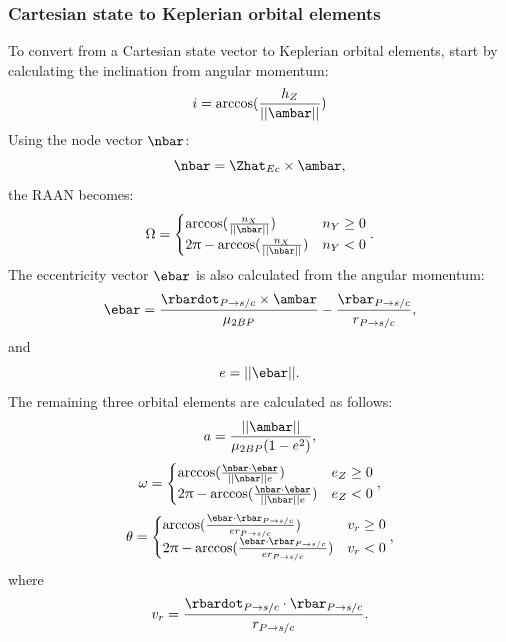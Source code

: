 \subsubsection{Cartesian state to Keplerian orbital elements}
To convert from a Cartesian state vector to Keplerian orbital elements, start by calculating the
inclination from angular momentum:
\begin{equation}
    i=\arccos(\frac{h_{Z}}{||\ambar||})
    \label{eq:inclination}
\end{equation}
Using the node vector $\nbar$:
\begin{equation}
    \nbar=\Zhat_{Ec}\times\ambar,
    \label{eq:nodes}
\end{equation}
the RAAN becomes:
\begin{equation}
    \Omega=\begin{cases}\arccos(\frac{n_{X}}{||\nbar||})&n_{Y}\geq0\cr2\pi-\arccos(\frac{n_{X}}{||\nbar||})&n_{Y}<0\end{cases}.
    \label{RAAN}
\end{equation}
The eccentricity vector $\ebar$ is also calculated from the angular momentum:
\begin{equation}
    \ebar=\frac{\rbardot_{P\rightarrow s/c}\times\ambar}{\mu_{2BP}}-\frac{\rbar_{P\rightarrow s/c}}{r_{P\rightarrow s/c}},
    \label{eq:eccentricityvector}
\end{equation}
and
\begin{equation}
    e=||\ebar||.
    \label{eq:eccentricity}
\end{equation}
The remaining three orbital elements are calculated as follows:
\begin{equation}
    a=\frac{||\ambar||}{\mu_{2BP}(1-e^{2})},
    \label{eq:semimajoraxis}
\end{equation}
\begin{equation}
    \omega=\begin{cases}\arccos(\frac{\nbar\cdot\ebar}{||\nbar||e})&e_{Z}\geq0\cr2\pi-\arccos(\frac{\nbar\cdot\ebar}{||\nbar||e})&e_{Z}<0\end{cases},
    \label{eq:argumentofperiapsis}
\end{equation}
\begin{equation}
    \theta=\begin{cases}\arccos(\frac{\ebar\cdot\rbar_{P\rightarrow s/c}}{er_{P\rightarrow s/c}})&v_{r}\geq0\cr2\pi-\arccos(\frac{\ebar\cdot\rbar_{P\rightarrow s/c}}{er_{P\rightarrow s/c}})&v_{r}<0\end{cases},
    \label{eq:trueanomaly}
\end{equation}
where
\begin{equation}
    v_{r}=\frac{\rbardot_{P\rightarrow s/c}\cdot\rbar_{P\rightarrow s/c}}{r_{P\rightarrow s/c}}.
    \label{eq:radialvelocity}
\end{equation}

